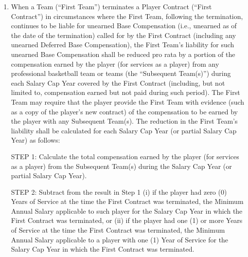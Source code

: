 \documentclass[
]{book}
\begin{document}
\begin{enumerate}
\def\labelenumi{(\alph{enumi})}
\item
  When a Team (``First Team'') terminates a Player Contract (``First Contract'') in circumstances where the First Team, following the termination, continues to be liable for unearned Base Compensation (i.e., unearned as of the date of the termination) called for by the First Contract (including any unearned Deferred Base Compensation), the First Team's liability for such unearned Base Compensation shall be reduced pro rata by a portion of the compensation earned by the player (for services as a player) from any professional basketball team or teams (the ``Subsequent Team(s)'') during each Salary Cap Year covered by the First Contract (including, but not limited to, compensation earned but not paid during such period). The First Team may require that the player provide the First Team with evidence (such as a copy of the player's new contract) of the compensation to be earned by the player with any Subsequent Team(s). The reduction in the First Team's liability shall be calculated for each Salary Cap Year (or partial Salary Cap Year) as follows:

  STEP 1: Calculate the total compensation earned by the player (for services as a player) from the Subsequent Team(s) during the Salary Cap Year (or partial Salary Cap Year).

  STEP 2: Subtract from the result in Step 1 (i) if the player had zero (0) Years of Service at the time the First Contract was terminated, the Minimum Annual Salary applicable to such player for the Salary Cap Year in which the First Contract was terminated, or (ii) if the player had one (1) or more Years of Service at the time the First Contract was terminated, the Minimum Annual Salary applicable to a player with one (1) Year of Service for the Salary Cap Year in which the First Contract was terminated.


\end{enumerate}
\end{document}
